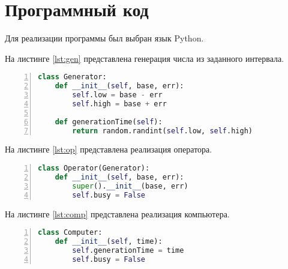 \chapter{Программный код}

Для реализации программы был выбран язык Python. %

На листинге \ref{lst:gen} представлена генерация числа из заданного интервала.
\begin{lstlisting}[language=Python,
    frame= tb,
    numbers=left,
    numberstyle=\footnotesize,
    caption={Генерация числа из заданного интервала},
    label={lst:gen}]
class Generator:
    def __init__(self, base, err):
        self.low = base - err
        self.high = base + err

    def generationTime(self):
        return random.randint(self.low, self.high)
\end{lstlisting}

На листинге \ref{lst:op} представлена реализация оператора.
\begin{lstlisting}[language=Python,
	frame= tb,
	numbers=left,
	numberstyle=\footnotesize,
	caption={Реализация оператора},
	label={lst:op}]
class Operator(Generator):
    def __init__(self, base, err):
        super().__init__(base, err)
        self.busy = False
\end{lstlisting}

На листинге \ref{lst:comp} представлена реализация компьютера.
\begin{lstlisting}[language=Python,
	frame= tb,
	numbers=left,
	numberstyle=\footnotesize,
	caption={Реализация компьютера},
	label={lst:comp}]
class Computer:
    def __init__(self, time):
        self.generationTime = time
        self.busy = False
\end{lstlisting}

